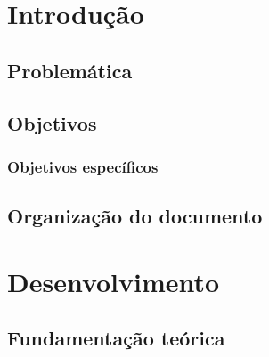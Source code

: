 \documentclass[
    12pt,               %
    openright,          %
    oneside,            %
    a4paper,            %
    english,            %
    french,             %
    spanish,            %
    brazil              %
    ]{abntex2}
\begin{document}
\chapter[Introdução]{Introdução}

\section{Problemática}

\section{Objetivos}

\subsection{Objetivos específicos}

\section{Organização do documento}



\chapter{Desenvolvimento}
\section{Fundamentação teórica}
\end{document}
